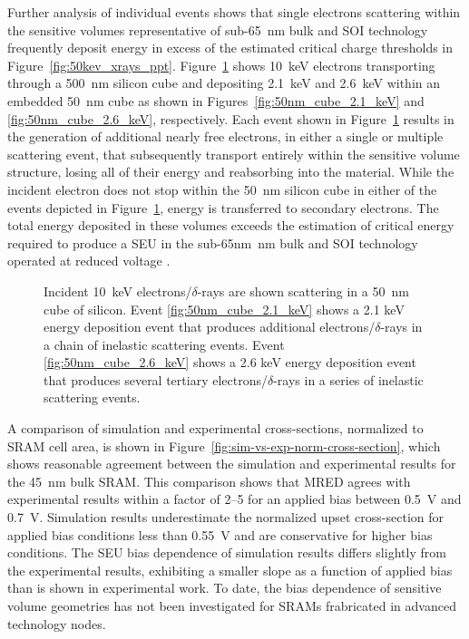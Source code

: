 Further analysis of individual events shows that single electrons scattering within the sensitive volumes representative of sub-65~nm bulk and SOI technology frequently deposit energy in excess of the estimated critical charge thresholds in Figure~\ref{fig:50kev_xrays_ppt}.
Figure~\ref{fig:50nm_cube_silicon} shows 10~keV electrons transporting through a 500~nm silicon cube and depositing 2.1~keV and 2.6~keV within an embedded 50~nm cube as shown in Figures~\ref{fig:50nm_cube_2.1_keV} and \ref{fig:50nm_cube_2.6_keV}, respectively. 
Each event shown in Figure~\ref{fig:50nm_cube_silicon} results in the generation of additional nearly free electrons, in either a single or multiple scattering event, that subsequently transport entirely within the sensitive volume structure, losing all of their energy and reabsorbing into the material.
While the incident electron does not stop within the 50~nm silicon cube in either of the events depicted in Figure~\ref{fig:50nm_cube_silicon}, energy is transferred to secondary electrons.
The total energy deposited in these volumes exceeds the estimation of critical energy required to produce a SEU in the sub-65nm~nm bulk and SOI technology operated at reduced voltage \cite{Rodbell:2007vl}.
\begin{figure}[htbp]
        \centering
        \caption{Incident 10~keV electrons/$\delta$-rays are shown scattering in a 50~nm cube of silicon. Event \ref{fig:50nm_cube_2.1_keV} shows a 2.1 keV energy deposition event that produces additional electrons/$\delta$-rays in a chain of inelastic scattering events. Event \ref{fig:50nm_cube_2.6_keV} shows a 2.6 keV energy deposition event that produces several tertiary electrons/$\delta$-rays in a series of inelastic scattering events.}
        \label{fig:50nm_cube_silicon}
\end{figure}

A comparison of simulation and experimental cross-sections, normalized to SRAM cell area, is shown in Figure~\ref{fig:sim-vs-exp-norm-cross-section}, which shows reasonable agreement between the simulation and experimental results for the 45~nm bulk SRAM.
This comparison shows that MRED agrees with experimental results within a factor of 2--5 for an applied bias between 0.5~V and 0.7~V.
Simulation results underestimate the normalized upset cross-section for applied bias conditions less than 0.55~V and are conservative for higher bias conditions.
The SEU bias dependence of simulation results differs slightly from the experimental results, exhibiting a smaller slope as a function of applied bias than is shown in experimental work. 
To date, the bias dependence of sensitive volume geometries has not been investigated for SRAMs frabricated in advanced technology nodes.

